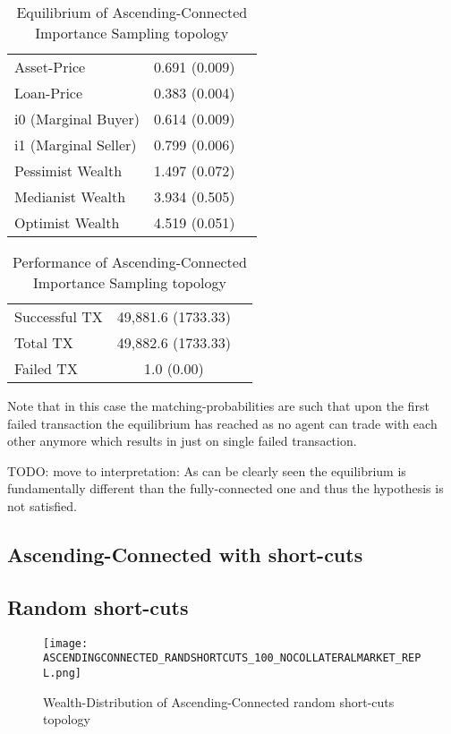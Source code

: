 \documentclass[Bachelorarbeit.tex]{subfiles}
\begin{document}
\begin{table}[h]
	\caption{Equilibrium of Ascending-Connected Importance Sampling topology}
	\centering
	\begin{tabular} { l c r }
		\hline
		Asset-Price & 0.691 (0.009) \\
		Loan-Price & 0.383 (0.004) \\
		i0 (Marginal Buyer) & 0.614 (0.009) \\
		i1 (Marginal Seller) & 0.799 (0.006) \\
		Pessimist Wealth & 1.497 (0.072) \\
		Medianist Wealth & 3.934 (0.505) \\
		Optimist Wealth & 4.519 (0.051) \\
		\hline
	\end{tabular}
\end{table} 

\begin{table}[h]
	\caption{Performance of Ascending-Connected Importance Sampling topology}
	\centering
	\begin{tabular} { l c r }
		\hline
		Successful TX & 49,881.6 (1733.33) \\
		Total TX & 49,882.6 (1733.33) \\
		Failed TX & 1.0 (0.00) \\
		\hline
	\end{tabular}
\end{table}

Note that in this case the matching-probabilities are such that upon the first failed transaction the equilibrium has reached as no agent can trade with each other anymore which results in just on single failed transaction.

TODO: move to interpretation: As can be clearly seen the equilibrium is fundamentally different than the fully-connected one and thus the hypothesis is not satisfied.

\subsection{Ascending-Connected with short-cuts}

\subsection{Random short-cuts}
\begin{figure}[H]
	\centering
  \texttt{[image: ASCENDINGCONNECTED\_RANDSHORTCUTS\_100\_NOCOLLATERALMARKET\_REPL.png]}
	\caption{Wealth-Distribution of Ascending-Connected random short-cuts topology}
	\label{fig1}
\end{figure}
\end{document}
